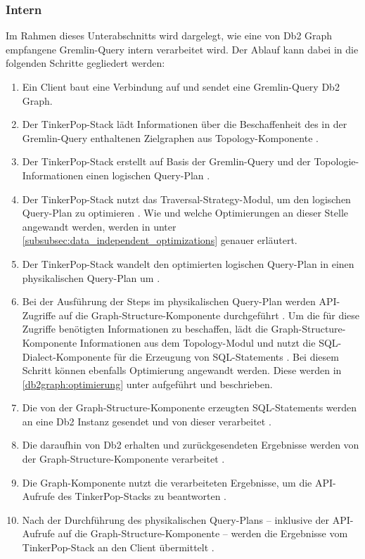 \subsubsection{Intern}
Im Rahmen dieses Unterabschnitts wird dargelegt, wie eine von Db2 Graph empfangene Gremlin-Query intern verarbeitet wird. Der Ablauf kann dabei in die folgenden Schritte gegliedert werden: 

\begin{enumerate}
    \item Ein Client baut eine Verbindung auf und sendet eine Gremlin-Query Db2 Graph.
    \item Der TinkerPop-Stack lädt Informationen über die Beschaffenheit des in der Gremlin-Query enthaltenen Zielgraphen aus Topology-Komponente \cite{vldb_tian,sigmod_tian, yt_tian}.
    \item Der TinkerPop-Stack erstellt auf Basis der Gremlin-Query und der Topologie-Informationen einen logischen Query-Plan \cite{vldb_tian,sigmod_tian, yt_tian}. 
    \item Der TinkerPop-Stack nutzt das Traversal-Strategy-Modul, um den logischen Query-Plan zu optimieren \cite{vldb_tian,sigmod_tian, yt_tian}. Wie und welche Optimierungen an dieser Stelle angewandt werden, werden in  unter \autoref{subsubsec:data_independent_optimizations} genauer erläutert.
    \item Der TinkerPop-Stack wandelt den optimierten logischen Query-Plan in einen physikalischen Query-Plan um \cite{vldb_tian,sigmod_tian, yt_tian}. 
    \item Bei der Ausführung der Steps im physikalischen Query-Plan werden API-Zugriffe auf die Graph-Structure-Komponente durchgeführt \cite{vldb_tian,sigmod_tian, yt_tian}. Um die für diese Zugriffe benötigten Informationen zu beschaffen, lädt die Graph-Structure-Komponente Informationen aus dem Topology-Modul und nutzt die SQL-Dialect-Komponente für die Erzeugung von SQL-Statements \cite{vldb_tian,sigmod_tian, yt_tian}. Bei diesem Schritt können ebenfalls Optimierung angewandt werden. Diese werden in \autoref{db2graph:optimierung} unter  aufgeführt und beschrieben.
    \item Die von der Graph-Structure-Komponente erzeugten SQL-Statements werden an eine Db2 Instanz gesendet und von dieser verarbeitet \cite{vldb_tian,sigmod_tian, yt_tian}.
    \item Die daraufhin von Db2 erhalten und zurückgesendeten Ergebnisse werden von der Graph-Structure-Komponente verarbeitet \cite{yt_tian}. 
    \item Die Graph-Komponente nutzt die verarbeiteten Ergebnisse, um die API-Aufrufe des TinkerPop-Stacks zu beantworten \cite{vldb_tian,sigmod_tian, yt_tian}.
    \item Nach der Durchführung des physikalischen Query-Plans -- inklusive der API-Aufrufe auf die Graph-Structure-Komponente -- werden die Ergebnisse vom TinkerPop-Stack an den Client übermittelt \cite{vldb_tian,sigmod_tian, yt_tian}.
\end{enumerate}

